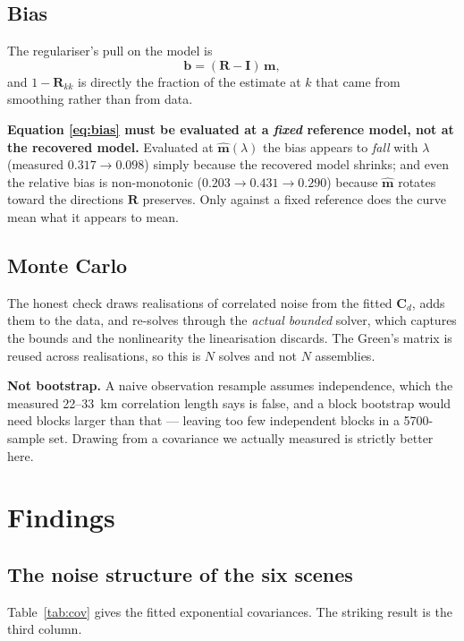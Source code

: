 \documentclass[11pt,a4paper]{article}
\newcommand{\R}{\mathbf{R}}
\newcommand{\Cd}{\mathbf{C}_d}
\newcommand{\bfm}{\bm{m}}
\newcommand{\note}[1]{\textcolor{red!60!black}{\textbf{#1}}}
\begin{document}
\subsection{Bias}

The regulariser's pull on the model is
\begin{equation}
\bm{b} = (\R - \bm{I})\,\bfm ,
\label{eq:bias}
\end{equation}
and $1 - \R_{kk}$ is directly the fraction of the estimate at $k$ that came from
smoothing rather than from data.

\note{Equation \eqref{eq:bias} must be evaluated at a \emph{fixed} reference
model, not at the recovered model.} Evaluated at $\hat{\bfm}(\lambda)$ the bias
appears to \emph{fall} with $\lambda$ (measured $0.317 \to 0.098$) simply because
the recovered model shrinks; and even the relative bias is non-monotonic
($0.203 \to 0.431 \to 0.290$) because $\hat{\bfm}$ rotates toward the directions
$\R$ preserves. Only against a fixed reference does the curve mean what it
appears to mean.

\subsection{Monte Carlo}

The honest check draws realisations of correlated noise from the fitted $\Cd$,
adds them to the data, and re-solves through the \emph{actual bounded} solver,
which captures the bounds and the nonlinearity the linearisation discards. The
Green's matrix is reused across realisations, so this is $N$ solves and not
$N$ assemblies.

\note{Not bootstrap.} A naive observation resample assumes independence, which
the measured 22--33~km correlation length says is false, and a block bootstrap
would need blocks larger than that --- leaving too few independent blocks in a
5700-sample set. Drawing from a covariance we actually measured is strictly
better here.

\section{Findings}
\label{sec:findings}

\subsection{The noise structure of the six scenes}

Table~\ref{tab:cov} gives the fitted exponential covariances. The striking
result is the third column.
\end{document}
